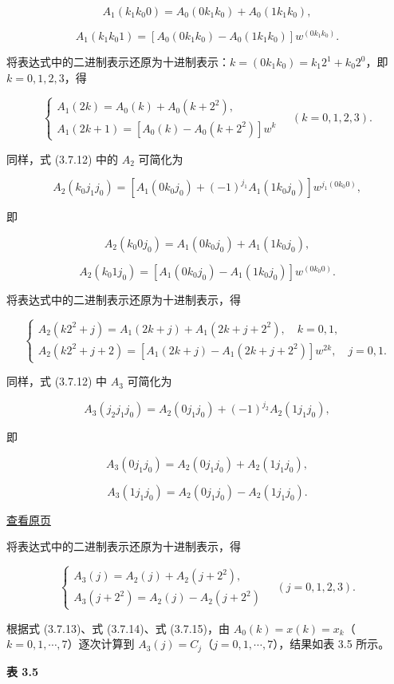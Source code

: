 \documentclass[
  10pt,
  fontset=fandol]{ctexart}
\begin{document}
\[
A_1(k_1k_0 0)=A_0(0k_1k_0)+A_0(1k_1k_0),
\]

\[
A_1(k_1k_0 1)=[A_0(0k_1k_0)-A_0(1k_1k_0)]w^{(0k_1k_0)}.
\]

将表达式中的二进制表示还原为十进制表示：\(k=(0k_1k_0)=k_1 2^1+k_0 2^0\)，即 \(k=0,1,2,3\)，得

\[
\begin{cases}
A_1(2k)=A_0(k)+A_0(k+2^2),\\
A_1(2k+1)=[A_0(k)-A_0(k+2^2)]w^k
\end{cases}\quad(k=0,1,2,3).\tag{3.7.13}
\]

同样，式 (3.7.12) 中的 \(A_2\) 可简化为

\[
A_2(k_0j_1j_0)=[A_1(0k_0j_0)+(-1)^{j_1}A_1(1k_0j_0)]w^{j_1(0k_0 0)},
\]

即

\[
A_2(k_0 0j_0)=A_1(0k_0j_0)+A_1(1k_0j_0),
\]

\[
A_2(k_0 1j_0)=[A_1(0k_0j_0)-A_1(1k_0j_0)]w^{(0k_0 0)}.
\]

将表达式中的二进制表示还原为十进制表示，得

\[
\begin{cases}
A_2(k2^2+j)=A_1(2k+j)+A_1(2k+j+2^2),\quad k=0,1,\\
A_2(k2^2+j+2)=[A_1(2k+j)-A_1(2k+j+2^2)]w^{2k},\quad j=0,1.
\end{cases}\tag{3.7.14}
\]

同样，式 (3.7.12) 中 \(A_3\) 可简化为

\[
A_3(j_2j_1j_0)=A_2(0j_1j_0)+(-1)^{j_2}A_2(1j_1j_0),
\]

即

\[
A_3(0j_1j_0)=A_2(0j_1j_0)+A_2(1j_1j_0),
\]

\[
A_3(1j_1j_0)=A_2(0j_1j_0)-A_2(1j_1j_0).
\]

\href{../../source-images/pdf-089.jpeg}{查看原页}

将表达式中的二进制表示还原为十进制表示，得

\[
\begin{cases}
A_3(j)=A_2(j)+A_2(j+2^2),\\
A_3(j+2^2)=A_2(j)-A_2(j+2^2)
\end{cases}\quad(j=0,1,2,3).\tag{3.7.15}
\]

根据式 (3.7.13)、式 (3.7.14)、式 (3.7.15)，由 \(A_0(k)=x(k)=x_k\)（\(k=0,1,\cdots,7\)）逐次计算到 \(A_3(j)=C_j\)（\(j=0,1,\cdots,7\)），结果如表 3.5 所示。

\textbf{表 3.5}
\end{document}
